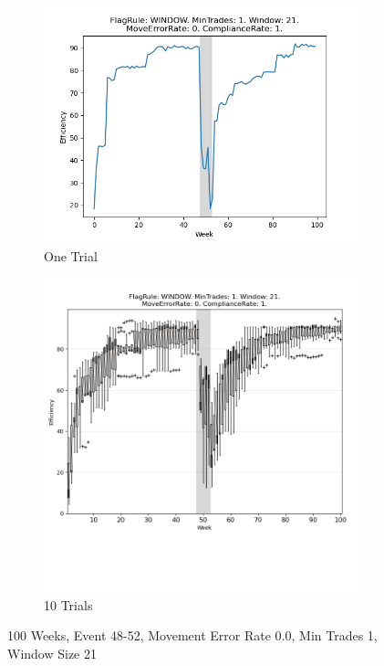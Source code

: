 \documentclass{article}%
\begin{document}
\begin{figure}[!htb]%
\begin{subfigure}[b]{0.45\linewidth}%
\includegraphics[width=\linewidth]{0051fr_WINDOW_mt_1_ws_21_er_0_cr_1_t1.png}%
\caption{One Trial}%
\end{subfigure}%
\begin{subfigure}[b]{0.45\linewidth}%
\includegraphics[clip,width=\linewidth,trim=0 4cm 0 0]{0051fr_WINDOW_mt_1_ws_21_er_0_cr_1_t10.png}%
\caption{10 Trials}%
\end{subfigure}%
\caption{100 Weeks, Event 48{-}52, Movement Error Rate 0.0, Min Trades 1, Window Size 21}%
\end{figure}
\end{document}

